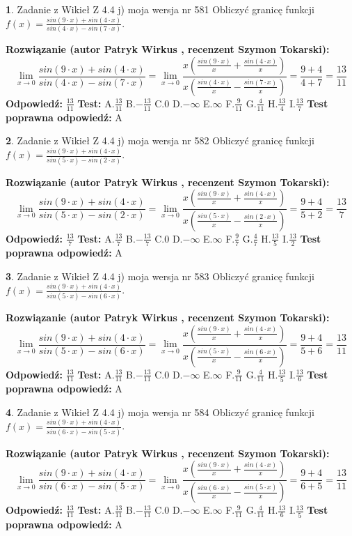 \documentclass[12pt, a4paper]{article}
\theoremstyle{definition} %
\newtheorem{zad}{}
\newcommand{\zadStart}[1]{\begin{zad}#1\newline}
\newcommand{\zadStop}{\end{zad}}
\newcommand{\rozwStart}[2]{\noindent \textbf{Rozwiązanie (autor #1 , recenzent #2): }\newline}
\newcommand{\rozwStop}{\newline}
\newcommand{\odpStart}{\noindent \textbf{Odpowiedź:}\newline}
\newcommand{\odpStop}{\newline}
\newcommand{\testStart}{\noindent \textbf{Test:}\newline}
\newcommand{\testStop}{\newline}
\newcommand{\kluczStart}{\noindent \textbf{Test poprawna odpowiedź:}\newline}
\newcommand{\kluczStop}{\newline}
\begin{document}
\zadStart{Zadanie z Wikieł Z 4.4 j) moja wersja nr 581}
Obliczyć granicę funkcji $f(x)=\frac{sin(9\cdot x) +sin(4\cdot x)}{sin(4\cdot x) -sin(7\cdot x)}$.
\zadStop
\rozwStart{Patryk Wirkus}{Szymon Tokarski}
$$\lim\limits_{x\to 0}\frac{sin(9\cdot x) +sin(4\cdot x)}{sin(4\cdot x) -sin(7\cdot x)}=\lim\limits_{x\to 0}\frac{x(\frac{sin(9\cdot x)}{x}+\frac{sin(4\cdot x)}{x})}{x(\frac{sin(4\cdot x)}{x}-\frac{sin(7\cdot x)}{x})}=\frac{9+4}{4+7} = \frac{13}{11}$$
\rozwStop
\odpStart
$\frac{13}{11}$
\odpStop
\testStart
A.$\frac{13}{11}$
B.$-\frac{13}{11}$
C.$0$
D.$-\infty$
E.$\infty$
F.$\frac{9}{11}$
G.$\frac{4}{11}$
H.$\frac{13}{4}$
I.$\frac{13}{7}$
\testStop
\kluczStart
A
\kluczStop



\zadStart{Zadanie z Wikieł Z 4.4 j) moja wersja nr 582}
Obliczyć granicę funkcji $f(x)=\frac{sin(9\cdot x) +sin(4\cdot x)}{sin(5\cdot x) -sin(2\cdot x)}$.
\zadStop
\rozwStart{Patryk Wirkus}{Szymon Tokarski}
$$\lim\limits_{x\to 0}\frac{sin(9\cdot x) +sin(4\cdot x)}{sin(5\cdot x) -sin(2\cdot x)}=\lim\limits_{x\to 0}\frac{x(\frac{sin(9\cdot x)}{x}+\frac{sin(4\cdot x)}{x})}{x(\frac{sin(5\cdot x)}{x}-\frac{sin(2\cdot x)}{x})}=\frac{9+4}{5+2} = \frac{13}{7}$$
\rozwStop
\odpStart
$\frac{13}{7}$
\odpStop
\testStart
A.$\frac{13}{7}$
B.$-\frac{13}{7}$
C.$0$
D.$-\infty$
E.$\infty$
F.$\frac{9}{7}$
G.$\frac{4}{7}$
H.$\frac{13}{5}$
I.$\frac{13}{2}$
\testStop
\kluczStart
A
\kluczStop



\zadStart{Zadanie z Wikieł Z 4.4 j) moja wersja nr 583}
Obliczyć granicę funkcji $f(x)=\frac{sin(9\cdot x) +sin(4\cdot x)}{sin(5\cdot x) -sin(6\cdot x)}$.
\zadStop
\rozwStart{Patryk Wirkus}{Szymon Tokarski}
$$\lim\limits_{x\to 0}\frac{sin(9\cdot x) +sin(4\cdot x)}{sin(5\cdot x) -sin(6\cdot x)}=\lim\limits_{x\to 0}\frac{x(\frac{sin(9\cdot x)}{x}+\frac{sin(4\cdot x)}{x})}{x(\frac{sin(5\cdot x)}{x}-\frac{sin(6\cdot x)}{x})}=\frac{9+4}{5+6} = \frac{13}{11}$$
\rozwStop
\odpStart
$\frac{13}{11}$
\odpStop
\testStart
A.$\frac{13}{11}$
B.$-\frac{13}{11}$
C.$0$
D.$-\infty$
E.$\infty$
F.$\frac{9}{11}$
G.$\frac{4}{11}$
H.$\frac{13}{5}$
I.$\frac{13}{6}$
\testStop
\kluczStart
A
\kluczStop



\zadStart{Zadanie z Wikieł Z 4.4 j) moja wersja nr 584}
Obliczyć granicę funkcji $f(x)=\frac{sin(9\cdot x) +sin(4\cdot x)}{sin(6\cdot x) -sin(5\cdot x)}$.
\zadStop
\rozwStart{Patryk Wirkus}{Szymon Tokarski}
$$\lim\limits_{x\to 0}\frac{sin(9\cdot x) +sin(4\cdot x)}{sin(6\cdot x) -sin(5\cdot x)}=\lim\limits_{x\to 0}\frac{x(\frac{sin(9\cdot x)}{x}+\frac{sin(4\cdot x)}{x})}{x(\frac{sin(6\cdot x)}{x}-\frac{sin(5\cdot x)}{x})}=\frac{9+4}{6+5} = \frac{13}{11}$$
\rozwStop
\odpStart
$\frac{13}{11}$
\odpStop
\testStart
A.$\frac{13}{11}$
B.$-\frac{13}{11}$
C.$0$
D.$-\infty$
E.$\infty$
F.$\frac{9}{11}$
G.$\frac{4}{11}$
H.$\frac{13}{6}$
I.$\frac{13}{5}$
\testStop
\kluczStart
A
\kluczStop
\end{document}
